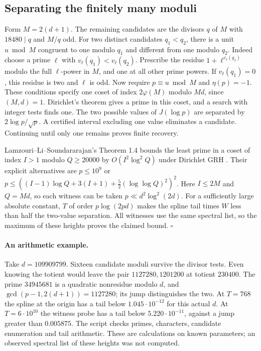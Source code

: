 \subsection*{Separating the finitely many moduli}
Form $M=2(d+1)$. The remaining candidates are the divisors $q$ of $M$
with $18480\mid q$ and $M/q$ odd. For two distinct candidates $q_1<q_2$,
there is a unit $u\bmod M$ congruent to one modulo $q_1$ and different
from one modulo $q_2$. Indeed choose a prime $\ell$ with
$v_\ell(q_1)<v_\ell(q_2)$. Prescribe the residue $1+\ell^{v_\ell(q_1)}$
modulo the full $\ell$-power in $M$, and one at all other prime powers.
If $v_\ell(q_1)=0$, this residue is two and $\ell$ is odd. Now require
$p\equiv u\bmod M$ and $\eta(p)=-1$. These conditions specify one coset of
index $2\varphi(M)$ modulo $Md$, since $(M,d)=1$. Dirichlet's theorem
gives a prime in this coset, and a search with integer tests finds one.
The two possible values of $J(\log p)$ are separated by $2\log p/\sqrt p$.
A certified interval excluding one value eliminates a candidate. Continuing
until only one remains proves finite recovery.

Lamzouri--Li--Soundararajan's Theorem 1.4 bounds the least prime in a coset
of index $I>1$ modulo $Q\ge20000$ by $O(I^2\log^2 Q)$ under Dirichlet GRH
\cite{lls}. Their explicit alternatives are $p\le10^9$ or
$p\le((I-1)\log Q+3(I+1)+\tfrac52(\log\log Q)^2)^2$. Here $I\le 2M$ and $Q=Md$, so each
witness can be taken $p\ll d^2\log^2(2d)$. For a sufficiently large absolute
constant, $T$ of order $p\log(2pd)$ makes the spline tail times $W$ less than
half the two-value separation. All witnesses use the same spectral list, so
the maximum of these heights proves the claimed bound.
\hfill$\square$

\paragraph{An arithmetic example.}
Take $d=109909799$. Sixteen candidate moduli survive the divisor tests. Even
knowing the totient would leave the pair $1127280,1201200$ at totient
$230400$. The prime $34945681$ is a quadratic nonresidue modulo $d$, and
$\gcd(p-1,2(d+1))=1127280$; its jump distinguishes the two. At $T=768$ the
spline at the origin has a tail below $1.045\cdot10^{-12}$ for this actual
$d$. At $T=6\cdot10^{10}$ the witness probe has a tail below
$5.220\cdot10^{-11}$, against a jump greater than $0.005875$.
The script checks primes, characters, candidate enumeration and tail
arithmetic. These are calculations on known parameters; an observed
spectral list of these heights was not computed.
